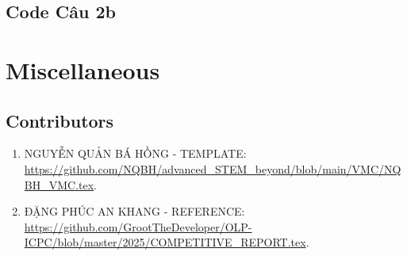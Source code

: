 \documentclass{article}
\begin{document}
\subsection{Code Câu 2b}
\vspace{10pt}

\section{Miscellaneous}

\subsection{Contributors}

\begin{enumerate}
	\item {\sc NGUYỄN QUẢN BÁ HỒNG - TEMPLATE}: \url{https://github.com/NQBH/advanced_STEM_beyond/blob/main/VMC/NQBH_VMC.tex}.
        \item  {\sc ĐẶNG PHÚC AN KHANG - REFERENCE}: 
    \url{https://github.com/GrootTheDeveloper/OLP-ICPC/blob/master/2025/COMPETITIVE_REPORT.tex}.
\end{enumerate}
        


\printbibliography[heading=bibintoc]
	
\end{document}
